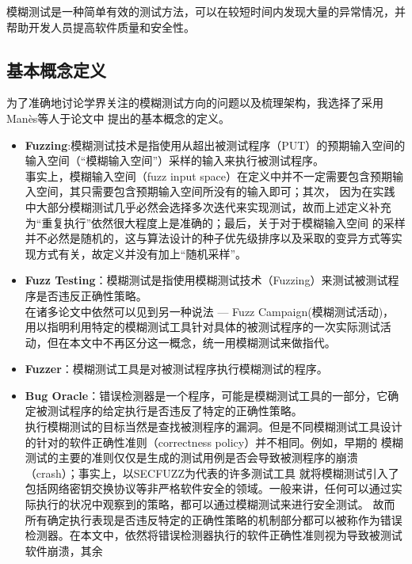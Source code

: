 \documentclass[bachelor]{njupthesis}
\begin{document}
模糊测试是一种简单有效的测试方法，可以在较短时间内发现大量的异常情况，并帮助开发人员提高软件质量和安全性。

\subsection{基本概念定义}
为了准确地讨论学界关注的模糊测试方向的问题以及梳理架构，我选择了采用Man{\`e}s等人于论文\cite{manes2019art}中
提出的基本概念的定义。

\begin{itemize}
	\item \textbf{Fuzzing}:模糊测试技术是指使用从超出被测试程序（PUT）的预期输入空间的输入空间（“模糊输入空间”）采样的输入来执行被测试程序。
	 \\ 事实上，模糊输入空间（fuzz input space）在定义中并不一定需要包含预期输入空间，其只需要包含预期输入空间所没有的输入即可；其次，
	 因为在实践中大部分模糊测试几乎必然会选择多次迭代来实现测试，故而上述定义补充为“重复执行”依然很大程度上是准确的；最后，关于对于模糊输入空间
	 的采样并不必然是随机的，这与算法设计的种子优先级排序以及采取的变异方式等实现方式有关，故定义并没有加上“随机采样”。
	 \\ 
	\item \textbf{Fuzz Testing}：模糊测试是指使用模糊测试技术（Fuzzing）来测试被测试程序是否违反正确性策略。
	\\ 在诸多论文\cite{householder2012probability,rebert2014optimizing,bohme2020fuzzing}中依然可以见到另一种说法 --- Fuzz Campaign(模糊测试活动)，
	用以指明利用特定的模糊测试工具针对具体的被测试程序的一次实际测试活动，但在本文中不再区分这一概念，统一用模糊测试来做指代。
	\\ 
	\item \textbf{Fuzzer}：模糊测试工具是对被测试程序执行模糊测试的程序。
	\\ 
	\item \textbf{Bug Oracle}：错误检测器是一个程序，可能是模糊测试工具的一部分，它确定被测试程序的给定执行是否违反了特定的正确性策略。
	\\ 执行模糊测试的目标当然是查找被测程序的漏洞。但是不同模糊测试工具设计的针对的软件正确性准则（correctness policy）并不相同。例如，早期的
	模糊测试的主要的准则仅仅是生成的测试用例是否会导致被测程序的崩溃（crash）；事实上，以SECFUZZ\cite{tsankov2012secfuzz}为代表的许多测试工具
	就将模糊测试引入了包括网络密钥交换协议等非严格软件安全的领域。一般来讲，任何可以通过实际执行的状况中观察到的策略，都可以通过模糊测试来进行安全测试。
	故而所有确定执行表现是否违反特定的正确性策略的机制部分都可以被称作为错误检测器。在本文中，依然将错误检测器执行的软件正确性准则视为导致被测试软件崩溃，其余

\end{itemize}
\end{document}
